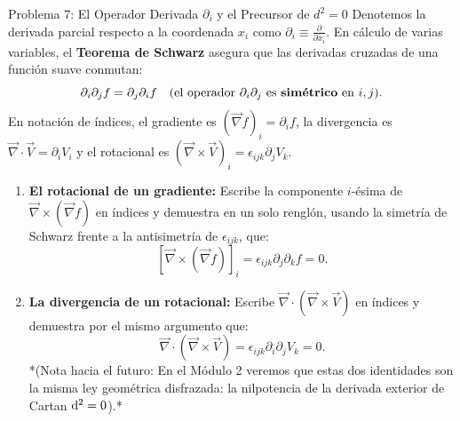 \documentclass[11pt,letterpaper]{article}
\begin{document}
\begin{infobox}{Problema 7: El Operador Derivada $\partial_i$ y el Precursor de $d^2 = 0$}
Denotemos la derivada parcial respecto a la coordenada $x_i$ como $\partial_i \equiv \frac{\partial}{\partial x_i}$. En cálculo de varias variables, el \textbf{Teorema de Schwarz} asegura que las derivadas cruzadas de una función suave conmutan:
\[
\partial_i \partial_j f = \partial_j \partial_i f \quad (\text{el operador } \partial_i \partial_j \text{ es \textbf{simétrico} en } i, j).
\]
En notación de índices, el gradiente es $(\vec{\nabla}f)_i = \partial_i f$, la divergencia es $\vec{\nabla}\cdot\vec{V} = \partial_i V_i$ y el rotacional es $(\vec{\nabla}\times\vec{V})_i = \epsilon_{ijk} \partial_j V_k$.
\begin{enumerate}[label=(\alph*)]
    \item \textbf{El rotacional de un gradiente:} Escribe la componente $i$-ésima de $\vec{\nabla} \times (\vec{\nabla}f)$ en índices y demuestra en un solo renglón, usando la simetría de Schwarz frente a la antisimetría de $\epsilon_{ijk}$, que:
    \[
    [\vec{\nabla} \times (\vec{\nabla}f)]_i = \epsilon_{ijk} \partial_j \partial_k f = 0.
    \]
    \item \textbf{La divergencia de un rotacional:} Escribe $\vec{\nabla} \cdot (\vec{\nabla} \times \vec{V})$ en índices y demuestra por el mismo argumento que:
    \[
    \vec{\nabla} \cdot (\vec{\nabla} \times \vec{V}) = \epsilon_{ijk} \partial_i \partial_j V_k = 0.
    \]
    *(Nota hacia el futuro: En el Módulo 2 veremos que estas dos identidades son la misma ley geométrica disfrazada: la nilpotencia de la derivada exterior de Cartan $\mathrm{d}^2 = 0$).*
\end{enumerate}
\end{infobox}
\end{document}

